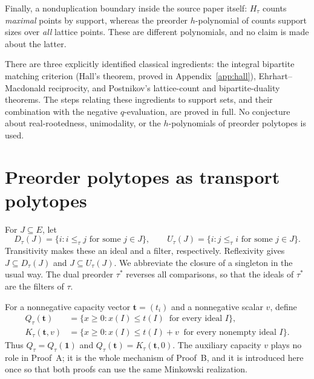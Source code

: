 \documentclass[11pt]{article}
\numberwithin{equation}{section}
\theoremstyle{definition}
\theoremstyle{remark}
\newcommand{\one}{\mathbf 1}
\begin{document}
Finally, a nonduplication boundary inside the source paper itself:
$H_\tau$ counts \emph{maximal} points by support, whereas the preorder
$h$-polynomial of \cite[Section~5]{AC} counts support sizes over \emph{all}
lattice points. These are different polynomials, and no claim is made about
the latter.

There are three explicitly identified classical ingredients: the integral
bipartite matching criterion (Hall's theorem, proved in
Appendix~\ref{app:hall}), Ehrhart--Macdonald reciprocity, and Postnikov's
lattice-count and bipartite-duality theorems. The steps relating these
ingredients to support sets, and their combination with the negative
$q$-evaluation, are proved in full. No conjecture about real-rootedness,
unimodality, or the $h$-polynomials of preorder polytopes is used.

\section{Preorder polytopes as transport polytopes}
\label{sec:transport}

For $J\subseteq E$, let
\[
 D_\tau(J)=\{i:i\le_\tau j\text{ for some }j\in J\},\qquad
 U_\tau(J)=\{i:j\le_\tau i\text{ for some }j\in J\}.
\]
Transitivity makes these an ideal and a filter, respectively. Reflexivity
gives $J\subseteq D_\tau(J)$ and $J\subseteq U_\tau(J)$. We abbreviate the
closure of a singleton in the usual way. The dual preorder $\tau^*$ reverses
all comparisons, so that the ideals of $\tau^*$ are the filters of $\tau$.

For a nonnegative capacity vector $\mathbf t=(t_i)$ and a nonnegative scalar
$v$, define
\begin{equation}
\begin{aligned}
 Q_\tau(\mathbf t)&=
 \{x\ge0:x(I)\le t(I)\ \text{ for every ideal }I\},\\
 K_\tau(\mathbf t,v)&=
 \{x\ge0:x(I)\le t(I)+v\ \text{ for every nonempty ideal }I\}.
\end{aligned}
 \label{eq:weighted-Q}
\end{equation}
Thus $Q_\tau=Q_\tau(\one)$ and $Q_\tau(\mathbf t)=K_\tau(\mathbf t,0)$. The
auxiliary capacity $v$ plays no role in Proof~A; it is the whole mechanism of
Proof~B, and it is introduced here once so that both proofs can use the same
Minkowski realization.
\end{document}
